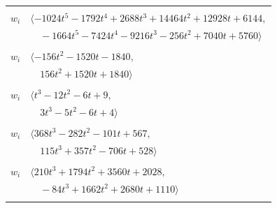 \documentclass[11pt]{article}
\begin{document}
\begin{longtable}{@{}ll@{}}
\addlinespace[2pt]
\multicolumn{2}{@{}p{0.97\textwidth}@{}}{$i=50$, $D_i=128$, $\rho_{ij}$: $2{:}1, \allowbreak 11{:}2, \allowbreak 12{:}2, \allowbreak 24{:}2, \allowbreak 41{:}1, \allowbreak 49{:}2, \allowbreak 52{:}1, \allowbreak 60{:}1, \allowbreak 65{:}1, \allowbreak 69{:}1$}\\
$w_i$ & $\langle -1024t^{5}-1792t^{4}+2688t^{3}+14464t^{2}+12928t+6144,$\\
 & $\quad -1664t^{5}-7424t^{4}-9216t^{3}-256t^{2}+7040t+5760\rangle$\\
\addlinespace[2pt]
\multicolumn{2}{@{}p{0.97\textwidth}@{}}{$i=51$, $D_i=4$, $\rho_{ij}$: $13{:}2, \allowbreak 22{:}2, \allowbreak 30{:}1, \allowbreak 32{:}1, \allowbreak 44{:}1, \allowbreak 53{:}2, \allowbreak 56{:}1, \allowbreak 59{:}2, \allowbreak 61{:}2$}\\
$w_i$ & $\langle -156t^{2}-1520t-1840,$\\
 & $\quad 156t^{2}+1520t+1840\rangle$\\
\addlinespace[2pt]
\multicolumn{2}{@{}p{0.97\textwidth}@{}}{$i=52$, $D_i=4$, $\rho_{ij}$: $20{:}1, \allowbreak 37{:}1, \allowbreak 41{:}1, \allowbreak 43{:}2, \allowbreak 50{:}2, \allowbreak 64{:}2$}\\
$w_i$ & $\langle t^{3}-12t^{2}-6t+9,$\\
 & $\quad 3t^{3}-5t^{2}-6t+4\rangle$\\
\addlinespace[2pt]
\multicolumn{2}{@{}p{0.97\textwidth}@{}}{$i=53$, $D_i=8$, $\rho_{ij}$: $3{:}2, \allowbreak 5{:}2, \allowbreak 7{:}1, \allowbreak 8{:}2, \allowbreak 20{:}2, \allowbreak 27{:}2, \allowbreak 44{:}2, \allowbreak 51{:}1, \allowbreak 55{:}2, \allowbreak 60{:}2, \allowbreak 71{:}2$}\\
$w_i$ & $\langle 368t^{3}-282t^{2}-101t+567,$\\
 & $\quad 115t^{3}+357t^{2}-706t+528\rangle$\\
\addlinespace[2pt]
\multicolumn{2}{@{}p{0.97\textwidth}@{}}{$i=54$, $D_i=4$, $\rho_{ij}$: $4{:}2, \allowbreak 10{:}1, \allowbreak 12{:}2, \allowbreak 15{:}2, \allowbreak 26{:}2, \allowbreak 29{:}2, \allowbreak 35{:}1, \allowbreak 41{:}2, \allowbreak 56{:}1, \allowbreak 67{:}2$}\\
$w_i$ & $\langle 210t^{3}+1794t^{2}+3560t+2028,$\\
 & $\quad -84t^{3}+1662t^{2}+2680t+1110\rangle$\\
\addlinespace[2pt]
\multicolumn{2}{@{}p{0.97\textwidth}@{}}{$i=55$, $D_i=6$, $e_i=2$, $\rho_{ij}$: $3{:}1, \allowbreak 21{:}2, \allowbreak 27{:}2, \allowbreak 36{:}1, \allowbreak 40{:}2, \allowbreak 45{:}1, \allowbreak 53{:}1, \allowbreak 60{:}1, \allowbreak 68{:}2, \allowbreak 71{:}1$}\\

\end{longtable}
\end{document}
